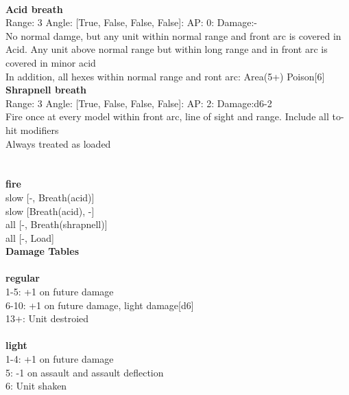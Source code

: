 \ \\
{\bf Acid breath } \\



Range: 3  Angle: [True, False, False, False]: AP: 0: Damage:- \\
No normal damge, but any unit within normal range and front arc is covered in Acid. Any unit above normal range but within long range and in front arc is covered in minor acid\\ 
In addition, all hexes within normal range and ront arc: Area(5+) Poison[6]\\ 




{\bf Shrapnell breath } \\



Range: 3  Angle: [True, False, False, False]: AP: 2: Damage:d6-2 \\
Fire once at every model within front arc, line of sight and range. Include all to-hit modifiers\\ 
Always treated as loaded\\ 




 
\ \\




\ \\ {\bf fire } \\
slow [-, Breath(acid)] \\
slow [Breath(acid), -] \\
all [-, Breath(shrapnell)] \\
all [-, Load] \\


{\bf Damage Tables} \\
\ \\ {\bf regular } \\
1-5: +1 on future damage \\
6-10: +1 on future damage, light damage[d6] \\
13+: Unit destroied \\
\ \\ {\bf light } \\
1-4: +1 on future damage \\
5: -1 on assault and assault deflection \\
6: Unit shaken \\










